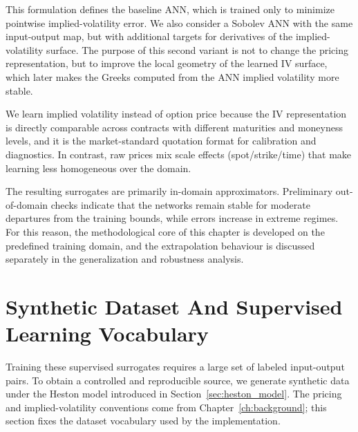 This formulation defines the baseline ANN, which is trained only to minimize pointwise implied-volatility error. We also consider a Sobolev ANN with the same input-output map, but with additional targets for derivatives of the implied-volatility surface. The purpose of this second variant is not to change the pricing representation, but to improve the local geometry of the learned IV surface, which later makes the Greeks computed from the ANN implied volatility more stable.

We learn implied volatility instead of option price because the IV representation is directly comparable across contracts with different maturities and moneyness levels, and it is the market-standard quotation format for calibration and diagnostics. In contrast, raw prices mix scale effects (spot/strike/time) that make learning less homogeneous over the domain.

The resulting surrogates are primarily in-domain approximators. Preliminary out-of-domain checks indicate that the networks remain stable for moderate departures from the training bounds, while errors increase in extreme regimes. For this reason, the methodological core of this chapter is developed on the predefined training domain, and the extrapolation behaviour is discussed separately in the generalization and robustness analysis.

\section{Synthetic Dataset And Supervised Learning Vocabulary}
\label{sec:ann_synthetic_dataset}
Training these supervised surrogates requires a large set of labeled input-output pairs. To obtain a controlled and reproducible source, we generate synthetic data under the Heston model introduced in Section~\ref{sec:heston_model}. The pricing and implied-volatility conventions come from Chapter~\ref{ch:background}; this section fixes the dataset vocabulary used by the implementation.

